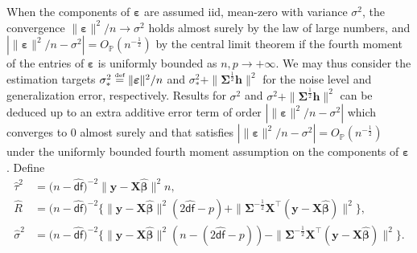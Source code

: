 \documentclass[11pt]{amsart}
\numberwithin{equation}{section}
\numberwithin{equation}{section}
\def\P{{\mathbb{P}}}
\def\mathbold{\boldsymbol} %
\def\bh{\mathbold{h}}\def\hhat{\widehat{h}}\def\htil{\widetilde{h}}
\def\bX{\mathbold{X}}\def\hbX{{\widehat{\bX}}}\def\tbX{{\widetilde{\bX}}}\def\bXbar{{\overline \bX}}
\def\by{\mathbold{y}}\def\yhat{\widehat{y}}\def\ytil{\widetilde{y}}\def\ybar{{\overline y}}\def\vby{{\bf y}}
\def\bbeta{\mathbold{\beta}}\def\betahat{\widehat{\beta}}\def\hbeta{\widehat{\beta}}
\def\hbbeta{{{\widehat{\bbeta}}}}
\def\ep{\varepsilon}\def\eps{\epsilon}\def\veps{\varepsilon}
\def\bep{ {\mathbold{\ep} }}
\def\bSigma{\mathbold{\Sigma}}\def\hbSigma{{\widehat{\bSigma}}}
\def\defas{\stackrel{\text{\tiny def}}{=}}
\def\df{{\hat{\mathsf{df}}}{}}
\begin{document}
When the components of $\bep$ are assumed iid, mean-zero with variance $\sigma^2$, the convergence
$\|\bep\|^2/n\to \sigma^2$ holds almost surely
by the law of large numbers, and
$|\|\bep\|^2/n - \sigma^2| = O_\P(n^{-\frac12})$
by the central limit theorem if the fourth moment of the entries of $\bep$
is uniformly bounded as $n,p\to+\infty$.
We may thus consider the estimation
targets
$\sigma_*^2 \defas \|\bep\|^2/n$
and
$\sigma_*^2 + \|\bSigma^{\frac12}\bh\|^2 $
for the noise level and generalization
error, respectively.
Results for $\sigma^2$ and $\sigma^2+\|\bSigma^{\frac12}\bh\|^2$
can be deduced up to an extra additive error term of order
$|\|\bep\|^2/n - \sigma^2|$ which converges to 0 almost surely
and that satisfies
$|\|\bep\|^2/n - \sigma^2| = O_\P(n^{-\frac12})$
under the uniformly bounded fourth moment assumption
on the components of $\bep$. Define
\begin{equation}
\begin{aligned}
    \hat \tau^2 &= \big(n-\df\big)^{-2}  \|\by - \bX\hbbeta\|^2 n,
\\
    \hat R & =\big(n-\df\big)^{-2} \big\{ \|\by - \bX\hbbeta\|^2
        (2\df - p)
+ \|\bSigma^{-\frac12}\bX^\top(\by - \bX\hbbeta)\|^2\big\}
,
\\
        \hat\sigma^2 &=
\big(n - \df\big)^{-2}
\big\{
    \|\by - \bX\hbbeta\|^2(n-(2\df - p))
 - \|\bSigma^{-\frac12}\bX^\top(\by - \bX\hbbeta)\|^2
\big\}.
\end{aligned}
\label{tau_hat_R_hat_sigma_hat}
\end{equation}
\end{document}
